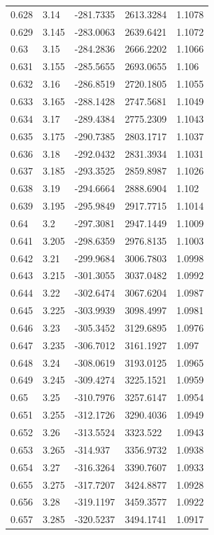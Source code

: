 \begin{tabular}{lllll}
0.628 & 3.14 & -281.7335 & 2613.3284 & 1.1078 \\
0.629 & 3.145 & -283.0063 & 2639.6421 & 1.1072 \\
0.63 & 3.15 & -284.2836 & 2666.2202 & 1.1066 \\
0.631 & 3.155 & -285.5655 & 2693.0655 & 1.106 \\
0.632 & 3.16 & -286.8519 & 2720.1805 & 1.1055 \\
0.633 & 3.165 & -288.1428 & 2747.5681 & 1.1049 \\
0.634 & 3.17 & -289.4384 & 2775.2309 & 1.1043 \\
0.635 & 3.175 & -290.7385 & 2803.1717 & 1.1037 \\
0.636 & 3.18 & -292.0432 & 2831.3934 & 1.1031 \\
0.637 & 3.185 & -293.3525 & 2859.8987 & 1.1026 \\
0.638 & 3.19 & -294.6664 & 2888.6904 & 1.102 \\
0.639 & 3.195 & -295.9849 & 2917.7715 & 1.1014 \\
0.64 & 3.2 & -297.3081 & 2947.1449 & 1.1009 \\
0.641 & 3.205 & -298.6359 & 2976.8135 & 1.1003 \\
0.642 & 3.21 & -299.9684 & 3006.7803 & 1.0998 \\
0.643 & 3.215 & -301.3055 & 3037.0482 & 1.0992 \\
0.644 & 3.22 & -302.6474 & 3067.6204 & 1.0987 \\
0.645 & 3.225 & -303.9939 & 3098.4997 & 1.0981 \\
0.646 & 3.23 & -305.3452 & 3129.6895 & 1.0976 \\
0.647 & 3.235 & -306.7012 & 3161.1927 & 1.097 \\
0.648 & 3.24 & -308.0619 & 3193.0125 & 1.0965 \\
0.649 & 3.245 & -309.4274 & 3225.1521 & 1.0959 \\
0.65 & 3.25 & -310.7976 & 3257.6147 & 1.0954 \\
0.651 & 3.255 & -312.1726 & 3290.4036 & 1.0949 \\
0.652 & 3.26 & -313.5524 & 3323.522 & 1.0943 \\
0.653 & 3.265 & -314.937 & 3356.9732 & 1.0938 \\
0.654 & 3.27 & -316.3264 & 3390.7607 & 1.0933 \\
0.655 & 3.275 & -317.7207 & 3424.8877 & 1.0928 \\
0.656 & 3.28 & -319.1197 & 3459.3577 & 1.0922 \\
0.657 & 3.285 & -320.5237 & 3494.1741 & 1.0917 \\

\end{tabular}
